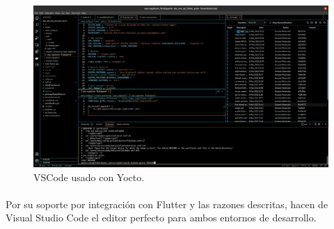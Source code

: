\begin{figure}[H]
	\centering
	\includegraphics[width=0.90\linewidth]{imgs/vscode-perspective}
	\caption[VSCode yocto]{VSCode usado con Yocto.}
	\label{fig:vscode-perpective}
\end{figure}

\paragraph{}Por su soporte por integración con Flutter y las razones descritas, hacen
de Visual Studio Code el editor perfecto para ambos entornos de desarrollo.

